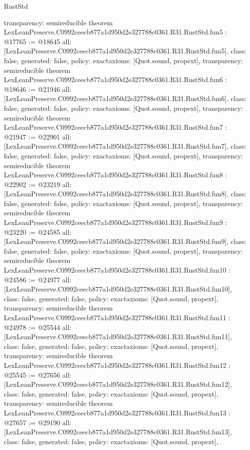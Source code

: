 \begin{lexlean}{RustStd}
\begin{coremodule}
{  transparency: semireducible
}
theorem LexLeanPreserve.C0992ceecb877a1d950d2e327788c0361.R31.RustStd.fun5 : @17765 := @18645 {
  all: [LexLeanPreserve.C0992ceecb877a1d950d2e327788c0361.R31.RustStd.fun5],
  class: false,
  generated: false,
  policy: exact{axioms: [Quot.sound, propext]},
  transparency: semireducible
}
theorem LexLeanPreserve.C0992ceecb877a1d950d2e327788c0361.R31.RustStd.fun6 : @18646 := @21946 {
  all: [LexLeanPreserve.C0992ceecb877a1d950d2e327788c0361.R31.RustStd.fun6],
  class: false,
  generated: false,
  policy: exact{axioms: [Quot.sound, propext]},
  transparency: semireducible
}
theorem LexLeanPreserve.C0992ceecb877a1d950d2e327788c0361.R31.RustStd.fun7 : @21947 := @22901 {
  all: [LexLeanPreserve.C0992ceecb877a1d950d2e327788c0361.R31.RustStd.fun7],
  class: false,
  generated: false,
  policy: exact{axioms: [Quot.sound, propext]},
  transparency: semireducible
}
theorem LexLeanPreserve.C0992ceecb877a1d950d2e327788c0361.R31.RustStd.fun8 : @22902 := @23219 {
  all: [LexLeanPreserve.C0992ceecb877a1d950d2e327788c0361.R31.RustStd.fun8],
  class: false,
  generated: false,
  policy: exact{axioms: [Quot.sound, propext]},
  transparency: semireducible
}
theorem LexLeanPreserve.C0992ceecb877a1d950d2e327788c0361.R31.RustStd.fun9 : @23220 := @24585 {
  all: [LexLeanPreserve.C0992ceecb877a1d950d2e327788c0361.R31.RustStd.fun9],
  class: false,
  generated: false,
  policy: exact{axioms: [Quot.sound, propext]},
  transparency: semireducible
}
theorem LexLeanPreserve.C0992ceecb877a1d950d2e327788c0361.R31.RustStd.fun10 : @24586 := @24977 {
  all: [LexLeanPreserve.C0992ceecb877a1d950d2e327788c0361.R31.RustStd.fun10],
  class: false,
  generated: false,
  policy: exact{axioms: [Quot.sound, propext]},
  transparency: semireducible
}
theorem LexLeanPreserve.C0992ceecb877a1d950d2e327788c0361.R31.RustStd.fun11 : @24978 := @25544 {
  all: [LexLeanPreserve.C0992ceecb877a1d950d2e327788c0361.R31.RustStd.fun11],
  class: false,
  generated: false,
  policy: exact{axioms: [Quot.sound, propext]},
  transparency: semireducible
}
theorem LexLeanPreserve.C0992ceecb877a1d950d2e327788c0361.R31.RustStd.fun12 : @25545 := @27656 {
  all: [LexLeanPreserve.C0992ceecb877a1d950d2e327788c0361.R31.RustStd.fun12],
  class: false,
  generated: false,
  policy: exact{axioms: [Quot.sound, propext]},
  transparency: semireducible
}
theorem LexLeanPreserve.C0992ceecb877a1d950d2e327788c0361.R31.RustStd.fun13 : @27657 := @29190 {
  all: [LexLeanPreserve.C0992ceecb877a1d950d2e327788c0361.R31.RustStd.fun13],
  class: false,
  generated: false,
  policy: exact{axioms: [Quot.sound, propext]},
}
\end{coremodule}
\end{lexlean}
